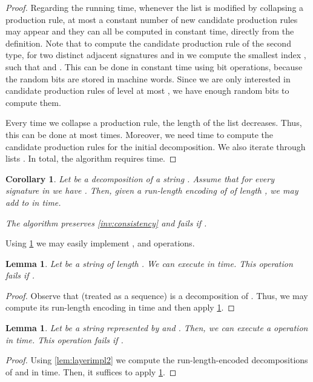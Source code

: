 \documentclass[a4paper]{article}
\newtheorem{lemma}[theorem]{Lemma}
\newtheorem{corollary}[theorem]{Corollary}
\theoremstyle{remark}
\begin{document}
\begin{proof}
Regarding the running time, whenever the list  is modified by collapsing a production rule, at most a constant number of new candidate production rules may appear and they can all be computed in constant time, directly from the definition.
Note that to compute the candidate production rule of the second type, for two distinct adjacent signatures  and  in  we compute the smallest index , such that  and .
This can be done in constant time using bit operations, because the random bits  are stored in machine words.
Since we are only interested in candidate production rules of level at most , we have enough random bits to compute them.

Every time we collapse a production rule, the length of the list  decreases.
Thus, this can be done at most  times.
Moreover, we need  time to compute the candidate production rules for the initial decomposition.
We also iterate through  lists .
In total, the algorithm requires  time.
\end{proof}

\begin{corollary}\label{cor:decomposition-to-sig}
Let  be a decomposition of a string .
Assume that for every signature  in  we have .
Then, given a run-length encoding of  of length , we may add  to  in  time.

The algorithm preserves \cref{inv:consistency} and fails if .
\end{corollary}

Using \cref{cor:decomposition-to-sig} we may easily implement ,  and  operations.

\begin{lemma}\label{lem:makeop}
Let  be a string of length .
We can execute  in  time.
This operation fails if .
\end{lemma}

\begin{proof}
Observe that  (treated as a sequence) is a decomposition of .
Thus, we may compute its run-length encoding in  time and then apply \cref{cor:decomposition-to-sig}.
\end{proof}

\begin{lemma}\label{lem:splitop}
Let  be a string represented by  and .
Then, we can execute a  operation in  time.
This operation fails if .
\end{lemma}

\begin{proof}
Using \cref{lem:layerimpl2} we compute the run-length-encoded decompositions of  and  in  time.
Then, it suffices to apply \cref{cor:decomposition-to-sig}.
\end{proof}
\end{document}
